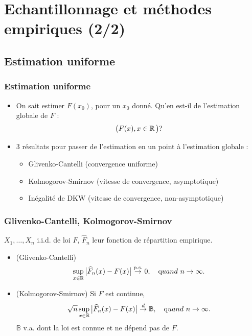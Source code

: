 \section{Echantillonnage et méthodes empiriques (2/2)}
\subsection{Estimation uniforme}
\begin{frame}
\frametitle{Estimation uniforme}
\begin{itemize}
\item On \og sait \fg{} estimer $F(x_0)$, pour un $x_0$ donné. Qu'en est-il de l'estimation \alert{globale} de $F$ :
$$\big(F(x), x \in \operatorname{{\mathbb R}}\big) ?$$
\item 3 résultats pour passer de l'estimation en un point à \alert{l'estimation globale} :
\begin{itemize}
\item Glivenko-Cantelli (convergence uniforme)
\item Kolmogorov-Smirnov (vitesse de convergence, asymptotique)
\item Inégalité de DKW (vitesse de convergence, non-asymptotique)
\end{itemize}
\end{itemize}
\end{frame}
\begin{frame}
\frametitle{Glivenko-Cantelli, Kolmogorov-Smirnov}
$X_1,\ldots, X_n$ i.i.d. de loi $F$, $\widehat F_n$ leur fonction de répartition empirique.
\begin{prop}
\begin{itemize}
\item (Glivenko-Cantelli) $$\sup_{x \in \operatorname{{\mathbb R}}}\big|\widehat F_n(x)-F(x)\big|
\stackrel{\mathrm{p.s.}}{\rightarrow}0, \quad {\text quand} \ n\to
\infty.$$
\item (Kolmogorov-Smirnov) Si $F$ est continue,
$$\sqrt{n}\sup_{x \in \operatorname{{\mathbb R}}}\big|\widehat F_n(x)-F(x)\big|
\stackrel{d}{\rightarrow} \mathbb{B}, \quad {\text quand} \ n\to
\infty.$$
$\mathbb{B}$ v.a. dont la loi est connue et \alert{
ne dépend pas} de $F$.
\end{itemize}
\end{prop}
\end{frame}
